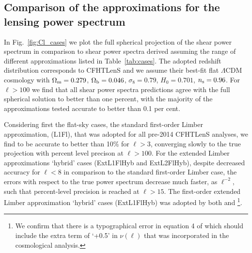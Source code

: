 \documentclass[fleqn,usenatbib]{mnras} %
\begin{document}
\subsection{Comparison of the approximations for the lensing power spectrum}
\label{sec:comp}


In Fig.~\ref{fig:Cl_cases} we plot the full spherical projection of the shear power spectrum in comparison to shear power spectra derived assuming
the range of different approximations listed in Table~\ref{tab:cases}.  The adopted redshift distribution corresponds to CFHTLenS
\cite{CFHTLenS-2pt-notomo} and we assume their best-fit flat $\Lambda$CDM cosmology with $\Omega_{\rm m}=0.279$, $\Omega_{\rm b}=0.046$, $\sigma_8=0.79$, $H_0=0.701$, $n_{\rm s}=0.96$. 
For $\ell > 100$ we find that all shear power spectra predictions agree with the full spherical solution to better than one percent, with the majority of the approximations tested accurate to better than 0.1 per cent.   

Considering first the flat-sky cases, the standard first-order Limber approximation, (L1Fl), that was adopted for all pre-2014 CFHTLenS analyses, we find to be 
accurate to better than 10\% for $\ell>3$, converging slowly to the true projection with percent level precison at $\ell>100$. 
For the extended Limber approximations `hybrid' cases (ExtL1FlHyb and ExtL2FlHyb), despite decreased accuracy
for $\ell < 8$ in comparison to the standard first-order Limber case, the errors with respect to
the true power spectrum decrease much faster, as $\ell^{-2}$, such that percent-level precision is reached at $\ell>15$.  The first-order extended Limber approximation `hybrid' cases (ExtL1FlHyb) was adopted by both \citet{joudaki/etal:2016} and \cite{KiDS-450}\footnote{We confirm that there is a typographical error in equation 4 of \cite{KiDS-450} which should include the extra term of `+0.5' in $\nu(\ell)$ that was incorporated in the cosmological analysis.}. 
\end{document}
